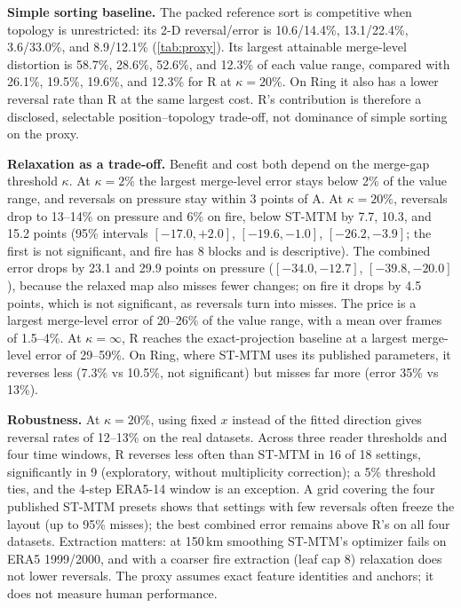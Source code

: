 \documentclass[review]{vgtc}                 %
\begin{document}
\textbf{Simple sorting baseline.} The packed reference sort is competitive when topology is unrestricted: its 2-D reversal/error is 10.6/14.4\%, 13.1/22.4\%, 3.6/33.0\%, and 8.9/12.1\% (\cref{tab:proxy}). Its largest attainable merge-level distortion is 58.7\%, 28.6\%, 52.6\%, and 12.3\% of each value range, compared with 26.1\%, 19.5\%, 19.6\%, and 12.3\% for R at $\kappa=20\%$. On Ring it also has a lower reversal rate than R at the same largest cost. R's contribution is therefore a disclosed, selectable position--topology trade-off, not dominance of simple sorting on the proxy.

\textbf{Relaxation as a trade-off.} Benefit and cost both depend on the merge-gap threshold $\kappa$. At $\kappa=2\%$ the largest merge-level error stays below 2\% of the value range, and reversals on pressure stay within 3 points of A. At $\kappa=20\%$, reversals drop to 13--14\% on pressure and 6\% on fire, below ST-MTM by 7.7, 10.3, and 15.2 points (95\% intervals $[-17.0,+2.0]$, $[-19.6,-1.0]$, $[-26.2,-3.9]$; the first is not significant, and fire has 8 blocks and is descriptive). The combined error drops by 23.1 and 29.9 points on pressure ($[-34.0,-12.7]$, $[-39.8,-20.0]$), because the relaxed map also misses fewer changes; on fire it drops by 4.5 points, which is not significant, as reversals turn into misses. The price is a largest merge-level error of 20--26\% of the value range, with a mean over frames of 1.5--4\%. At $\kappa=\infty$, R reaches the exact-projection baseline at a largest merge-level error of 29--59\%. On Ring, where ST-MTM uses its published parameters, it reverses less (7.3\% vs 10.5\%, not significant) but misses far more (error 35\% vs 13\%).

\textbf{Robustness.} At $\kappa=20\%$, using fixed $x$ instead of the fitted direction gives reversal rates of 12--13\% on the real datasets. Across three reader thresholds and four time windows, R reverses less often than ST-MTM in 16 of 18 settings, significantly in 9 (exploratory, without multiplicity correction); a 5\% threshold ties, and the 4-step ERA5-14 window is an exception. A grid covering the four published ST-MTM presets shows that settings with few reversals often freeze the layout (up to 95\% misses); the best combined error remains above R's on all four datasets. Extraction matters: at 150\,km smoothing ST-MTM's optimizer fails on ERA5 1999/2000, and with a coarser fire extraction (leaf cap 8) relaxation does not lower reversals. The proxy assumes exact feature identities and anchors; it does not measure human performance.
\end{document}
